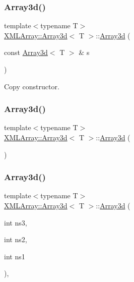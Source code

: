 \subsubsection{\texorpdfstring{Array3d()}{Array3d()}\hspace{0.1cm}{\footnotesize\ttfamily [3/6]}}
{\footnotesize\ttfamily template$<$typename T$>$ \\
\mbox{\hyperlink{classXMLArray_1_1Array3d}{X\+M\+L\+Array\+::\+Array3d}}$<$ T $>$\+::\mbox{\hyperlink{classXMLArray_1_1Array3d}{Array3d}} (\begin{DoxyParamCaption}\item[{const \mbox{\hyperlink{classXMLArray_1_1Array3d}{Array3d}}$<$ T $>$ \&}]{s }\end{DoxyParamCaption})\hspace{0.3cm}{\ttfamily [inline]}}



Copy constructor. 

\mbox{\label{classXMLArray_1_1Array3d_a05f33dbf6ca20ca7a16ec3e6d74f272b}} 
\subsubsection{\texorpdfstring{Array3d()}{Array3d()}\hspace{0.1cm}{\footnotesize\ttfamily [4/6]}}
{\footnotesize\ttfamily template$<$typename T$>$ \\
\mbox{\hyperlink{classXMLArray_1_1Array3d}{X\+M\+L\+Array\+::\+Array3d}}$<$ T $>$\+::\mbox{\hyperlink{classXMLArray_1_1Array3d}{Array3d}} (\begin{DoxyParamCaption}{ }\end{DoxyParamCaption})\hspace{0.3cm}{\ttfamily [inline]}}

\mbox{\label{classXMLArray_1_1Array3d_ae97f5fabfb023196e45ab6fd53d533d9}} 
\subsubsection{\texorpdfstring{Array3d()}{Array3d()}\hspace{0.1cm}{\footnotesize\ttfamily [5/6]}}
{\footnotesize\ttfamily template$<$typename T$>$ \\
\mbox{\hyperlink{classXMLArray_1_1Array3d}{X\+M\+L\+Array\+::\+Array3d}}$<$ T $>$\+::\mbox{\hyperlink{classXMLArray_1_1Array3d}{Array3d}} (\begin{DoxyParamCaption}\item[{int}]{ns3,  }\item[{int}]{ns2,  }\item[{int}]{ns1 }\end{DoxyParamCaption})\hspace{0.3cm}{\ttfamily [inline]}, {\ttfamily [explicit]}}

